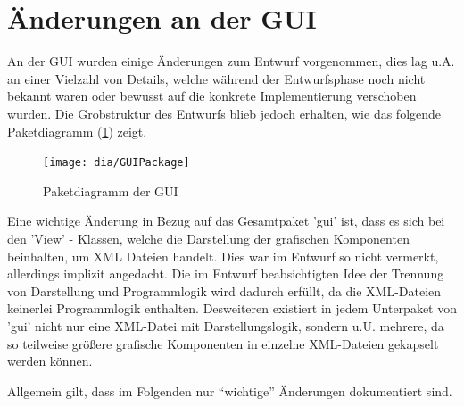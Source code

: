 \section{Änderungen an der GUI}
An der GUI wurden einige Änderungen zum Entwurf vorgenommen, dies lag u.A. an einer Vielzahl von Details, welche während der Entwurfsphase noch nicht bekannt waren oder bewusst auf die konkrete Implementierung verschoben wurden. 
Die Grobstruktur des Entwurfs blieb jedoch erhalten, wie das folgende Paketdiagramm (\ref{fig:GUI}) zeigt.
\begin{figure}[h!]
	\centering
	\texttt{[image: dia/GUIPackage]}
	\caption{Paketdiagramm der GUI}
	\label{fig:GUI}
\end{figure}

Eine wichtige Änderung in Bezug auf das Gesamtpaket 'gui' ist, dass es sich bei den 'View' - Klassen, welche die Darstellung der grafischen Komponenten beinhalten, um XML Dateien handelt. Dies war im Entwurf so nicht vermerkt, allerdings implizit angedacht. Die im Entwurf beabsichtigten Idee der Trennung von Darstellung und Programmlogik wird dadurch erfüllt, da die XML-Dateien keinerlei Programmlogik enthalten. Desweiteren existiert in jedem Unterpaket von 'gui' nicht nur eine XML-Datei mit Darstellungslogik, sondern u.U. mehrere, da so teilweise größere grafische Komponenten in einzelne XML-Dateien gekapselt werden können.
	
Allgemein gilt, dass im Folgenden nur "`wichtige"' Änderungen dokumentiert sind.

